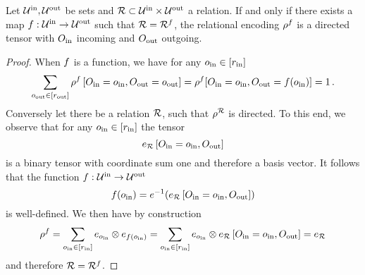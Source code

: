 \begin{theorem}\label{the:rencodingDirected}
	Let $\mathcal{U}^{\mathrm{in}},\mathcal{U}^{\mathrm{out}}$ be sets and $\mathcal{R}\subset\mathcal{U}^{\mathrm{in}}\times\mathcal{U}^{\mathrm{out}}$ a relation.
	If and only if there exists a map $f:\mathcal{U}^{\mathrm{in}}\rightarrow\mathcal{U}^{\mathrm{out}}$ such that $\mathcal{R}=\mathcal{R}^{f}$, the relational encoding $\rho^{f}$ is a directed tensor with $O_{\mathrm{in}}$ incoming and $O_{\mathrm{out}}$ outgoing.
\end{theorem}
\begin{proof}
	When $f$ is a function, we have for any $o_{\mathrm{in}}\in[r_{\mathrm{in}}]$
		\[ \sum_{o_{\mathrm{out}}\in[r_{\mathrm{out}}]} \rho^{f}\left[O_{\mathrm{in}}=o_{\mathrm{in}},O_{\mathrm{out}}=o_{\mathrm{out}}\right]
		=  \rho^{f}[O_{\mathrm{in}}=o_{\mathrm{in}},O_{\mathrm{out}}=f(o_{\mathrm{in}})] = 1 \, . \]
	Conversely let there be a relation $\mathcal{R}$, such that $\rho^{\mathcal{R}}$ is directed. %
	To this end, we observe that for any $o_{\mathrm{in}}\in[r_{\mathrm{in}}]$ the tensor
		\[  e_{\mathcal{R}}\left[O_{\mathrm{in}}=o_{\mathrm{in}},O_{\mathrm{out}}\right] \]
	is a binary tensor with coordinate sum one and therefore a basis vector.
	It follows that the function $f : \mathcal{U}^{\mathrm{in}} \rightarrow \mathcal{U}^{\mathrm{out}} $ 
		\[ f(o_{\mathrm{in}}) = e^{-1}(e_{\mathcal{R}}\left[O_{\mathrm{in}}=o_{\mathrm{in}},O_{\mathrm{out}}\right] ) \]
	is well-defined.
	We then have by construction
	\begin{align*}
		\rho^{f} 
		= \sum_{o_{\mathrm{in}}\in[r_{\mathrm{in}}]} e_{o_{\mathrm{in}}} \otimes e_{f(o_{\mathrm{in}})}
		=  \sum_{o_{\mathrm{in}}\in[r_{\mathrm{in}}]} e_{o_{\mathrm{in}}} \otimes e_{\mathcal{R}}\left[O_{\mathrm{in}}=o_{\mathrm{in}},O_{\mathrm{out}}\right] 
		= e_{\mathcal{R}}
	\end{align*}
	and therefore $\mathcal{R} = \mathcal{R}^{f}$.
\end{proof}

